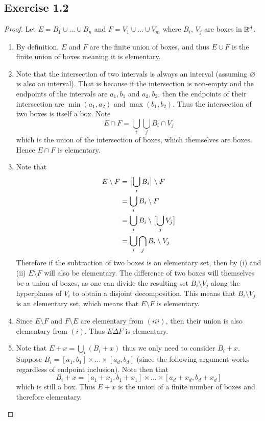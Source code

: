 \documentclass[hw_all.tex]{subfiles}
\begin{document}
\subsection{Exercise 1.2}

\begin{proof}
    Let $E = B_1 \cup \ldots \cup B_n$ and $F = V_1 \cup \ldots \cup V_m$ where $B_i$, $V_j$ are boxes in $\mathbb{R}^{d}$.
    \begin{enumerate}[label=(\roman*)]
        \item 
            By definition, $E$ and $F$ are the finite union of boxes, and thus $E \cup F$ is the finite union of boxes meaning it is elementary.

        \item 
            Note that the intersection of two intervals is always an interval (assuming $\varnothing$ is also an interval). That is because if the intersection is non-empty and the endpoints of the intervals are $a_1, b_1$ and $a_2, b_2$, then the endpoints of their intersection are $\min(a_1, a_2)$ and $\max(b_1, b_2)$. Thus the intersection of two boxes is itself a box. Note
            \[
                E \cap F = \bigcup_{i} \bigcup_{j} B_i \cap V_j
            \]
            which is the union of the intersection of boxes, which themselves are boxes. Hence $E \cap F$ is elementary.

        \item 
            Note that
            \begin{align*}
                E \setminus F &= \qty\big[\bigcup_i B_i] \setminus F \\
                &= \bigcup_i B_i \setminus F \\
                &= \bigcup_i B_i \setminus \qty\big[\bigcup_j V_j] \\
                &= \bigcup_i \bigcap_j B_i \setminus V_j
            \end{align*}
            Therefore if the subtraction of two boxes is an elementary set, then by (i) and (ii) $E \setminus F$ will also be elementary. The difference of two boxes will themselves be a union of boxes, as one can divide the resulting set $B_i \setminus V_j$ along the hyperplanes of $V_i$ to obtain a disjoint decomposition. This means that $B_i \setminus V_j$ is an elementary set, which means that $E \setminus F$ is elementary.

        \item 
            Since $E \setminus F$ and $F \setminus E$ are elementary from $(iii)$, then their union is also elementary from $(i)$. Thus $E \Delta F$ is elementary.

        \item 
            Note that $E + x = \bigcup_{i} (B_i + x)$ thus we only need to consider $B_i + x$. Suppose $B_i = [a_1,b_1] \times \ldots \times [a_d, b_d]$ (since the following argument works regardless of endpoint inclusion). Note then that
            \[
                B_i + x = [a_1 + x_1, b_1 + x_1] \times \ldots \times [a_d + x_d, b_d + x_d]
            \]
            which is still a box. Thus $E + x$ is the union of a finite number of boxes and therefore elementary.
    \end{enumerate}
\end{proof}
\end{document}
